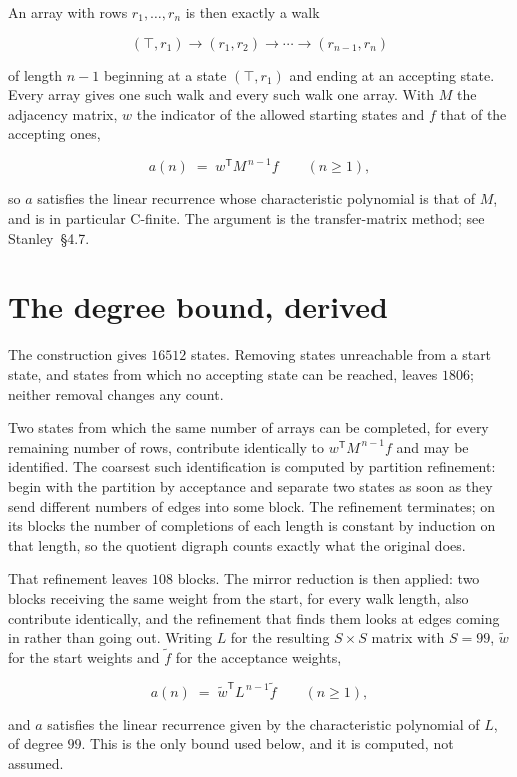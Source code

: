 \documentclass[11pt]{article}
\theoremstyle{definition}
\begin{document}
An array with rows $r_1,\dots,r_n$ is then exactly a walk

\[(\top,r_1) \to (r_1,r_2) \to \cdots \to (r_{n-1},r_n)\]

of length $n-1$ beginning at a state $(\top,r_1)$ and ending at an accepting state. Every array gives one such walk and every such walk one array. With $M$ the adjacency matrix, $w$ the indicator of the allowed starting states and $f$ that of the accepting ones,

\[a(n) \;=\; w^{\mathsf T} M^{\,n-1} f \qquad (n \ge 1),\]

so $a$ satisfies the linear recurrence whose characteristic polynomial is that of $M$, and is in particular C-finite. The argument is the transfer-matrix method; see Stanley~\S4.7.

\section{The degree bound, derived}

The construction gives $16512$ states. Removing states unreachable from a start state, and states from which no accepting state can be reached, leaves $1806$; neither removal changes any count.

Two states from which the same number of arrays can be completed, for every remaining number of rows, contribute identically to $w^{\mathsf T}M^{\,n-1}f$ and may be identified. The coarsest such identification is computed by partition refinement: begin with the partition by acceptance and separate two states as soon as they send different numbers of edges into some block. The refinement terminates; on its blocks the number of completions of each length is constant by induction on that length, so the quotient digraph counts exactly what the original does.

That refinement leaves $108$ blocks. The mirror reduction is then applied: two blocks receiving the same weight from the start, for every walk length, also contribute identically, and the refinement that finds them looks at edges coming in rather than going out. Writing $L$ for the resulting $S \times S$ matrix with $S = 99$, $\tilde w$ for the start weights and $\tilde f$ for the acceptance weights,

\[a(n) \;=\; \tilde w^{\mathsf T} L^{\,n-1} \tilde f \qquad (n \ge 1),\]

and $a$ satisfies the linear recurrence given by the characteristic polynomial of $L$, of degree $99$. This is the only bound used below, and it is computed, not assumed.
\end{document}
